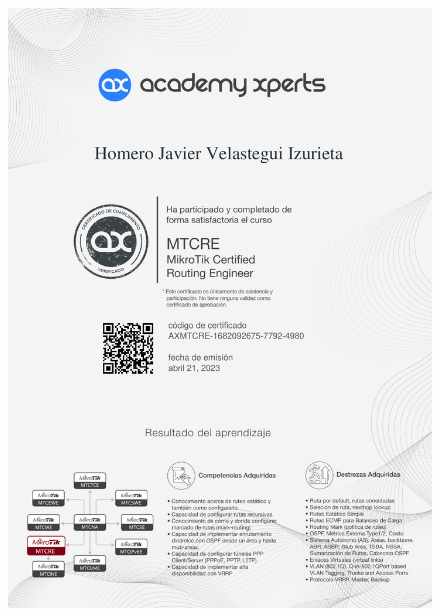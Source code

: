 \begin{figure}[ht]
    \setlength{\parindent}{-20pt}
    \includegraphics[width=\textwidth]{2.-Estudios/Certificados/11.pdf}
\end{figure}

